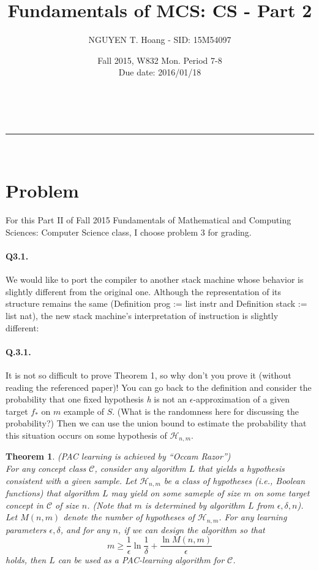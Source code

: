 \documentclass[a4paper,12pt]{article}
\makeatletter
\newcommand{\linia}{\rule{\linewidth}{0.5pt}}
\renewcommand{\maketitle} {
\begin{center}
\vspace{2ex}
{\huge \textsc{\@title}}
\vspace{1ex}
\\
\linia\\
\@author \hfill \@date
\vspace{4ex}
\end{center}
}
\newtheorem{theorem}{Theorem}
\makeatother
\begin{document}

\title{Fundamentals of MCS: CS - Part 2}

\author{NGUYEN T. Hoang - SID: 15M54097}

\date{Fall 2015, W832 Mon. Period 7-8 \\ \hfill Due date: 2016/01/18}

\maketitle

\section*{Problem}
\noindent
For this Part II of Fall 2015 Fundamentals of Mathematical and Computing Sciences: Computer Science class, I choose problem 3 for grading.



\paragraph{Q3.1.} We would like to port the compiler to another stack machine whose behavior is slightly different from the original one. Although the representation of its structure remains the same (Definition prog := list instr and Definition stack := list nat), the new stack machine's interpretation of instruction is slightly different:

\paragraph{Q.3.1.} It is not so difficult to prove Theorem 1, so why don't you prove it (without reading the referenced paper)! You can go back to the definition and consider the probability that one fixed hypothesis \emph{h} is not an $\epsilon$-approximation of a given target $f_{*}$ on $m$ example of $S$. (What is the randomness here for discussing the probability?) Then we can use the union bound to estimate the probability that this situation occurs on some hypothesis of $\mathcal{H}_{n,m}$.
\begin{theorem}
    (PAC learning is achieved by ``Occam Razor'') \\
    For any concept class $\mathcal{C}$, consider any algorithm $L$ that yields a hypothesis consistent with a given sample. Let $\mathcal{H}_{n,m}$ be a class of hypotheses (i.e., Boolean functions) that algorithm $L$ may yield on some sameple of size $m$ on some target concept in $\mathcal{C}$ of size $n$. (Note that $m$ is determined by algorithm $L$ from $\epsilon, \delta, n$). \\
    Let $M(n,m)$ denote the number of hypotheses of $\mathcal{H}_{n,m}$. For any learning parameters $\epsilon, \delta$, and for any $n$, if we can design the algorithm so that
    \begin{equation*}
        m \geq \frac{1}{\epsilon}\ln{\frac{1}{\delta}} + \frac{\ln{M(n,m)}}{\epsilon}
    \end{equation*}
holds, then $L$ can be used as a PAC-learning algorithm for $\mathcal{C}$.
\end{theorem}
\vfill
\pagebreak
\end{document}
